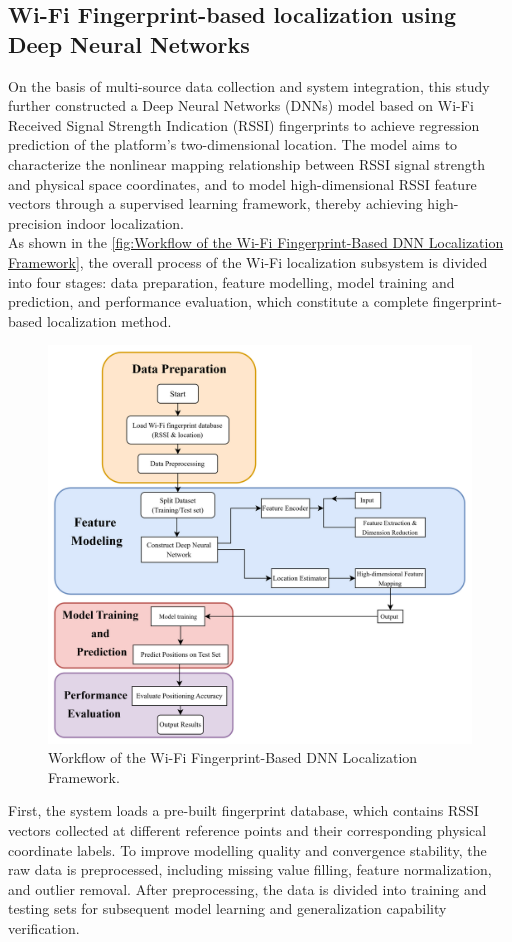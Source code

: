 \documentclass[12pt,a4paper]{article}
\numberwithin{equation}{section}
\begin{document}
\subsection{Wi-Fi Fingerprint-based localization using Deep Neural Networks }
On the basis of multi-source data collection and system integration, this study further constructed a Deep Neural Networks (DNNs) model based on Wi-Fi Received Signal Strength Indication (RSSI)  fingerprints to achieve regression prediction of the platform's two-dimensional location. The model aims to characterize the nonlinear mapping relationship between RSSI signal strength and physical space coordinates, and to model high-dimensional RSSI feature vectors through a supervised learning framework, thereby achieving high-precision indoor localization.\\
As shown in the \autoref{fig:Workflow of the Wi-Fi Fingerprint-Based DNN Localization Framework}, the overall process of the Wi-Fi localization subsystem is divided into four stages: data preparation, feature modelling, model training and prediction, and performance evaluation, which constitute a complete fingerprint-based localization method.
\begin{figure}[H]
    \centering
    \includegraphics[width=0.8\linewidth]{images/2.png}
    \caption{Workflow of the Wi-Fi Fingerprint-Based DNN Localization Framework.}
    \label{fig:Workflow of the Wi-Fi Fingerprint-Based DNN Localization Framework}
\end{figure}
\noindent First, the system loads a pre-built fingerprint database, which contains RSSI vectors collected at different reference points and their corresponding physical coordinate labels. To improve modelling quality and convergence stability, the raw data is preprocessed, including missing value filling, feature normalization, and outlier removal. After preprocessing, the data is divided into training and testing sets for subsequent model learning and generalization capability verification.
\end{document}
